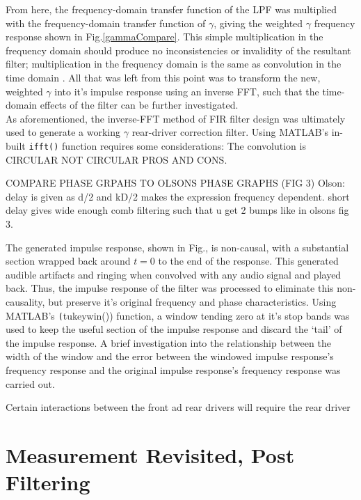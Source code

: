 \documentclass{report}
\begin{document}
            From here, the frequency-domain transfer function of the LPF was multiplied with the frequency-domain transfer function of $\gamma$, giving the weighted $\gamma$ frequency response shown in Fig.\ref{gammaCompare}.
            This simple multiplication in the frequency domain should produce no inconsistencies or invalidity of the resultant filter; multiplication in the frequency domain is the same as convolution in the time domain \cite{stanfordConvolution}.
            All that was left from this point was to transform the new, weighted $\gamma$ into it's impulse response using an inverse FFT, such that the time-domain effects of the filter can be further investigated.
            \\
            As aforementioned, the inverse-FFT method of FIR filter design was ultimately used to generate a working $\gamma$ rear-driver correction filter.
            Using MATLAB's in-built \texttt{ifft()} function requires some considerations: The convolution is CIRCULAR NOT CIRCULAR PROS AND CONS.

            COMPARE PHASE GRPAHS TO OLSONS PHASE GRAPHS (FIG 3)
            Olson:
            delay is given as d/2 and kD/2 makes the expression frequency dependent.
            short delay gives wide enough comb filtering such that u get 2 bumps like in olsons fig 3.


            


            The generated impulse response, shown in Fig., is non-causal, with a substantial section wrapped back around $t=0$ to the end of the response.
            This generated audible artifacts and ringing when convolved with any audio signal and played back.
            Thus, the impulse response of the filter was processed to eliminate this non-causality, but preserve it's original frequency and phase characteristics.
            Using MATLAB's \texttt(tukeywin()) function, a window tending zero at it's stop bands was used to keep the useful section of the impulse response and discard the `tail' of the impulse response.
            A brief investigation into the relationship between the width of the window and the error between the windowed impulse response's frequency response and the original impulse response's frequency response was carried out.

            Certain interactions between the front ad rear drivers will require the rear driver

    \section{Measurement Revisited, Post Filtering}
\end{document}
